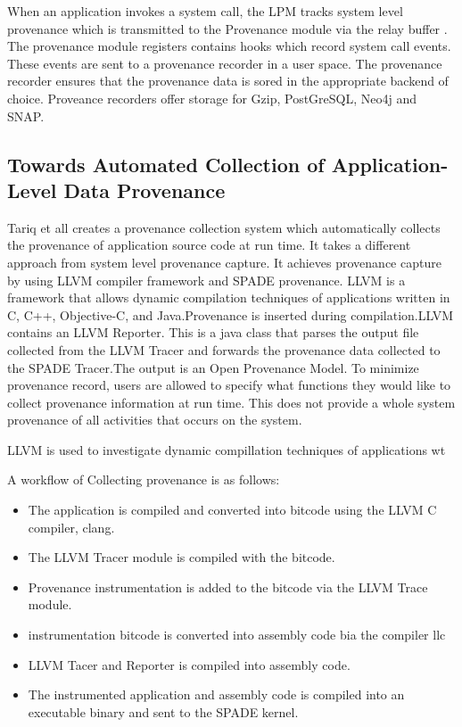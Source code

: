 \par When an application invokes a system call, the LPM tracks system level provenance which is transmitted to the Provenance module via the relay buffer . The provenance module registers contains hooks which record system call events. These events are sent to a provenance recorder in a user space. The provenance recorder ensures that the provenance data is sored in the appropriate backend of choice. Proveance recorders offer storage for Gzip, PostGreSQL, Neo4j and SNAP.



\subsection{Towards Automated Collection of Application-Level Data Provenance}
Tariq et all creates a provenance collection system which automatically collects the provenance of application source code at run time. It takes a different approach from system level provenance capture. It achieves provenance capture by using LLVM compiler framework and SPADE provenance. LLVM is a framework that allows dynamic compilation techniques of applications written in C, C++, Objective-C, and Java.Provenance is inserted during compilation.LLVM contains an LLVM Reporter. This is a java class that parses the output file collected from the LLVM Tracer and forwards the provenance data collected to the SPADE Tracer.The output is an Open Provenance Model. To minimize provenance record, users are allowed to specify what functions they would like to collect provenance information at run time. This does not provide a whole system provenance of all activities that occurs on the system.

LLVM is used to investigate dynamic compillation techniques of applications wt

A workflow of Collecting provenance is as follows:

\begin{itemize}
\item The application is compiled and converted into bitcode using the LLVM C compiler, clang.

\item The LLVM Tracer module is compiled with the bitcode.

\item Provenance instrumentation is added to the bitcode via the LLVM Trace module.

\item instrumentation bitcode is converted into assembly code bia the compiler llc

\item LLVM Tacer and Reporter is compiled into assembly code.

\item  The instrumented application and assembly code is compiled into an executable binary and sent to the SPADE kernel.
\end{itemize}


